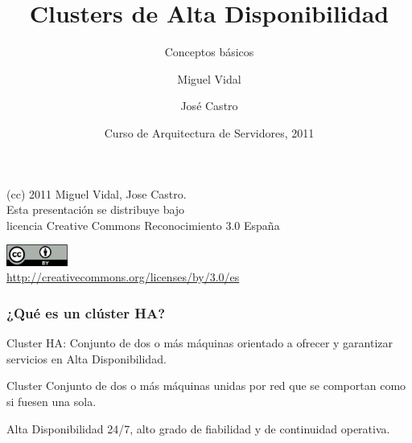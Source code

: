 \documentclass{beamer}
\begin{document}
\title{Clusters de Alta Disponibilidad}
\subtitle{Conceptos básicos}
\author{Miguel Vidal \and José Castro}
\date[CASUL 2011]{Curso de Arquitectura de Servidores, 2011}


\begin{frame}
  \vspace{2cm}
  \begin{flushright}
    {\small (cc) 2011 Miguel Vidal, Jose Castro.} \\
    \medskip
    {\scriptsize Esta presentación se distribuye bajo \\ licencia Creative Commons Reconocimiento 3.0 España}
  \end{flushright}
  \begin{center}
    \href{http://creativecommons.org/licenses/by/3.0/es}{\includegraphics[width=2cm]{format/cc-by.png}} \\
    {\tiny \url{http://creativecommons.org/licenses/by/3.0/es}}
  \end{center}
\end{frame}%


\usebackgroundtemplate{}



\begin{frame}
\frametitle{¿Qué es un clúster HA?}

\begin{definition}
\alert{Cluster HA}: Conjunto de dos o más máquinas orientado a ofrecer y garantizar servicios en \alert{Alta Disponibilidad}. 
\end{definition}

\begin{block}{Cluster}
Conjunto de dos o más máquinas unidas por red que se comportan como si fuesen una sola.
\end{block}

\begin{block}{Alta Disponibilidad}
24/7, alto grado de fiabilidad y de continuidad operativa.
\end{block}


\end{frame}
\end{document}
